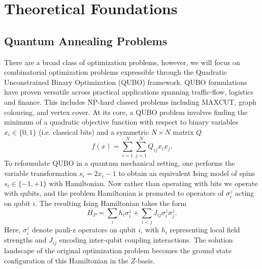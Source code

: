 \chapter{Theoretical Foundations}\label{Ch2:TheoreticalFoundations}

\section{Quantum Annealing Problems}
\qquad There are a broad class of optimization problems, however, we will focus on combinatorial optimization problems expressible through the Quadratic Unconstrained Binary Optimization (QUBO) framework. QUBO formulations have proven versatile across practical applications spanning traffic-flow, logistics and finance.\cite{BaltimoreQA,TrafficFlowOptimizationQA, FinancePortfolioQA} This includes NP-hard classed problems including MAXCUT, graph colouring, and vertex cover.\cite{ClassofQuboProblems} At its core, a QUBO problem involves finding the minimum of a quadratic objective function with respect to binary variables $x_i \in \{0,1\}$ (i.e. classical bits) and a symmetric $N \times N$ matrix $Q$
\begin{equation}\label{QUBOEquation}
    f(x) = \sum_{i=1}^{N} \sum_{j=1}^{N} Q_{ij} x_i x_j.
\end{equation} 
\qquad To reformulate QUBO in a quantum mechanical setting, one performs the variable transformation $s_i = 2x_i - 1$ to obtain an equivalent Ising model of spins $s_i \in \{-1,+1\}$ with Hamiltonian\cite{IsingFormulationsNPQA}. Now rather than operating with bits we operate with qubits, and the problem Hamiltonian is promoted to operators of $\sigma_i^z$ acting on qubit $i$. The resulting Ising Hamiltonian takes the form
\begin{equation}\label{IsingProblemEquation}
    H_P = \sum_{i} h_i \sigma_i^z + \sum_{i<j} J_{ij} \sigma_i^z \sigma_j^z.
\end{equation}
\qquad Here, $\sigma_i^z$ denote pauli-z operators on qubit $i$, with $h_i$ representing local field strengths and $J_{ij}$ encoding inter-qubit coupling interactions. The solution landscape of the original optimization problem becomes the ground state configuration of this Hamiltonian in the $Z$-basis. 


